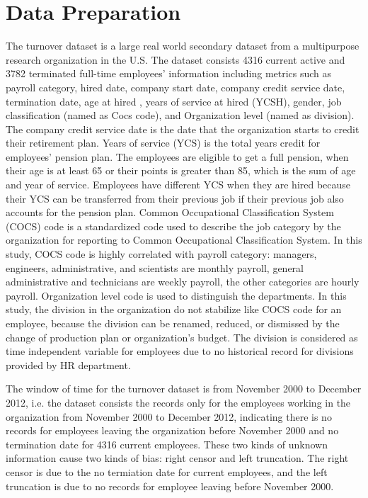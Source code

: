 \documentclass[12pt,letterpaper]{article}
\begin{document}
\section{Data Preparation}\label{data.desc}
The turnover dataset is a large real world secondary dataset from a multipurpose research organization in the U.S. The dataset consists 4316 current active and 3782 terminated full-time employees' information including metrics such as payroll category, hired date, company start date, company credit service date, termination date, age at hired , years of service at hired (YCSH), gender, job classification (named as Cocs code), and Organization level (named as division). The company credit service date is the date that the organization starts to credit their retirement plan. Years of service (YCS) is the total years credit for employees' pension plan. The employees are eligible to get a full pension, when their age is at least 65 or their points is greater than 85, which is the sum of age and year of service. Employees have different YCS when they are hired because their YCS can be transferred from their previous job if their previous job also accounts for the pension plan. %
Common Occupational Classification System (COCS) code is a standardized code used to describe the job category by the organization for reporting to Common Occupational Classification System. In this study, COCS code is highly correlated with payroll category: managers, engineers, administrative, and scientists are monthly payroll, general administrative and technicians are weekly payroll, the other categories are hourly payroll.
Organization level code is used to distinguish the departments. In this study, the division in the organization do not stabilize like COCS code for an employee, because the division can be renamed, reduced, or dismissed by the change of production plan or organization's budget. The division is considered as time independent variable for employees due to no historical record for divisions provided by HR department.

The window of time for the turnover dataset is from November 2000 to December 2012, i.e. the dataset consists the records only for the employees working in the organization from November 2000 to December 2012, indicating there is no records for employees leaving the organization before November 2000 and no termination date for 4316 current employees. These two kinds of unknown information cause two kinds of bias: right censor and left truncation. The right censor is due to the no termiation date for current employees, and the left truncation is due to no records for employee leaving before November 2000.
\end{document}

